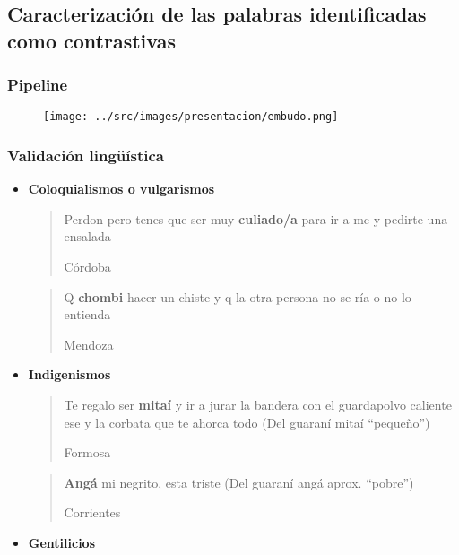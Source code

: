 \subsection{Caracterización de las palabras identificadas como contrastivas}


\begin{frame}[t]\frametitle{Pipeline}
    
\begin{figure}
  \centering
  \texttt{[image: ../src/images/presentacion/embudo.png]}
  \label{fig:embudo}
\end{figure}

\end{frame}

\begin{frame}[t]\frametitle{Validación lingüística}

   \begin{itemize}

      \label{it:caracterizacionLinguistica}

      \item \textbf{Coloquialismos o vulgarismos}

      \blockquote[Córdoba]{Perdon pero tenes que ser muy \textbf{culiado/a} para ir a mc y pedirte una ensalada}


      \blockquote[Mendoza]{Q \textbf{chombi} hacer un chiste y q la otra persona no se ría o no lo entienda}





      \item \textbf{Indigenismos}

      \blockquote[Formosa]{Te regalo ser \textbf{mitaí} y ir a jurar la bandera con el guardapolvo caliente ese y la corbata que te ahorca todo (Del guaraní mitaí “pequeño”)}

      \blockquote[Corrientes]{\textbf{Angá} mi negrito, esta triste (Del guaraní angá aprox. “pobre”)}

      \item \textbf{Gentilicios}


\end{itemize}
\end{frame}
